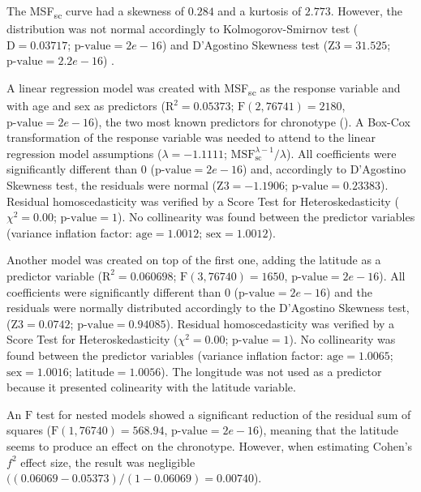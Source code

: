 \documentclass[
12pt,
openright,
oneside,
a4paper,
chapter=TITLE,
section=TITLE,
french,
spanish,
brazil,
english
]{abntex2}\usepackage{array}
\begin{document}
The MSF\textsubscript{sc} curve had a skewness of \(0.284\) and a
kurtosis of \(2.773\). However, the distribution was not normal
accordingly to Kolmogorov-Smirnov test (\(\text{D} = 0.03717\);
\(\text{p-value} = 2e-16\)) and D'Agostino Skewness test
(\(\text{Z3} = 31.525\); \(\text{p-value} = 2.2e-16\))
\autocites[see][]{dagostino1990}[also][46, p.~101]{thode2002}.

A linear regression model was created with MSF\textsubscript{sc} as the
response variable and with age and sex as predictors
(\(\text{R}^{2} = 0.05373\); \(\text{F}(2, 76741) = 2180\),
\(\text{p-value} = 2e-16\)), the two most known predictors for
chronotype (\textcite{roenneberg2007a}). A Box-Cox transformation of the
response variable was needed to attend to the linear regression model
assumptions (\(\lambda = -1.1111\);
\(\text{MSF}_{\text{sc}}^{\lambda - 1} / \lambda\)). All coefficients
were significantly different than \(0\) (\(\text{p-value} = 2e-16\))
and, accordingly to D'Agostino Skewness test, the residuals were normal
(\(\text{Z3} = -1.1906\); \(\text{p-value} = 0.23383\)). Residual
homoscedasticity was verified by a Score Test for Heteroskedasticity
(\(\chi^{2} = 0.00\); \(\text{p-value} = 1\)). No collinearity was found
between the predictor variables (variance inflation factor:
\(\text{age} = 1.0012\); \(\text{sex} = 1.0012\)).

Another model was created on top of the first one, adding the latitude
as a predictor variable (\(\text{R}^{2} = 0.060698\);
\(\text{F}(3, 76740) = 1650\), \(\text{p-value} = 2e-16\)). All
coefficients were significantly different than 0
(\(\text{p-value} = 2e-16\)) and the residuals were normally distributed
accordingly to the D'Agostino Skewness test, (\(\text{Z3} = 0.0742\);
\(\text{p-value} = 0.94085\)). Residual homoscedasticity was verified by
a Score Test for Heteroskedasticity (\(\chi^{2} = 0.00\);
\(\text{p-value} = 1\)). No collinearity was found between the predictor
variables (variance inflation factor: \(\text{age} = 1.0065\);
\(\text{sex} = 1.0016\); \(\text{latitude} = 1.0056\)). The longitude
was not used as a predictor because it presented colinearity with the
latitude variable.

An \(\text{F}\) test for nested models showed a significant reduction of
the residual sum of squares (\(\text{F}(1, 76740) = 568.94\),
\(\text{p-value} = 2e-16\)), meaning that the latitude seems to produce
an effect on the chronotype. However, when estimating Cohen's \(f^2\)
effect size, the result was negligible \autocite{cohen1992}
\(((0.06069 - 0.05373) / (1 - 0.06069) = 0.00740\)).
\end{document}
